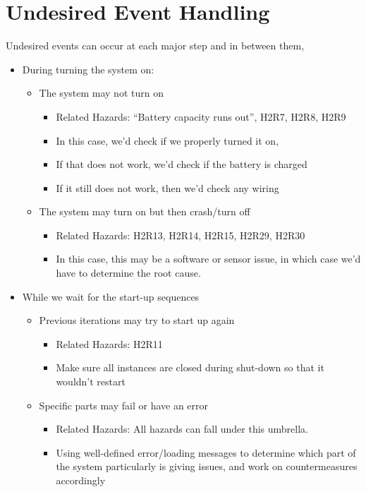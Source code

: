 \documentclass[11pt]{article}
\begin{document}
	\section{Undesired Event Handling}
		Undesired events can occur at each major step and in between them, 
		\begin{itemize}
			\item During turning the system on: 
			\begin{itemize}
				\item The system may not turn on 
				\begin{itemize}
					\item Related Hazards: “Battery capacity runs out”, H2R7, H2R8, H2R9
					\item In this case, we’d check if we properly turned it on,  
					\item If that does not work, we’d check if the battery is charged 
					\item If it still does not work, then we’d check any wiring 
				\end{itemize}
				\item The system may turn on but then crash/turn off 
					\begin{itemize}
						\item Related Hazards: H2R13, H2R14, H2R15, H2R29, H2R30
						\item In this case, this may be a software or sensor issue, in which case we’d have to determine the root cause. 
					\end{itemize}
			\end{itemize}
			\item While we wait for the start-up sequences 
			\begin{itemize}
				\item Previous iterations may try to start up again 
				\begin{itemize}
					\item Related Hazards: H2R11 
					\item Make sure all instances are closed during shut-down so that it wouldn’t restart 
				\end{itemize}
			\item Specific parts may fail or have an error 
				\begin{itemize}
					\item Related Hazards: All hazards can fall under this umbrella. 
					\item Using well-defined error/loading messages to determine which part of the system particularly is giving issues, and work on countermeasures accordingly 

\end{itemize}
\end{itemize}
\end{itemize}
\end{document}
